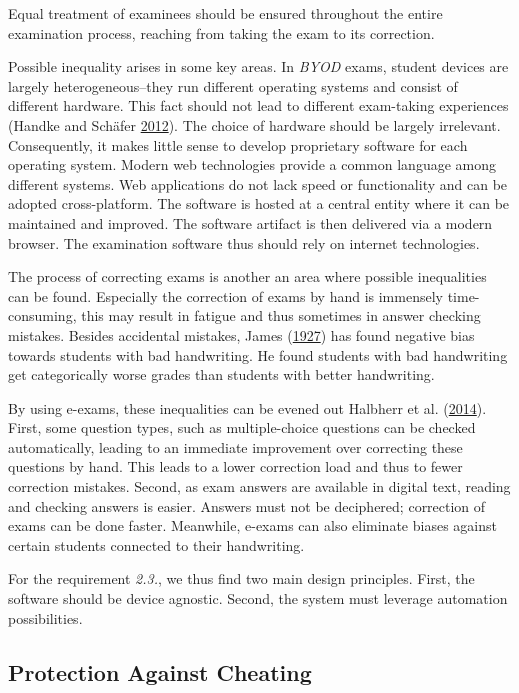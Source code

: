 Equal treatment of examinees should be ensured throughout the entire
examination process, reaching from taking the exam to its correction.

Possible inequality arises in some key areas. In \emph{BYOD} exams,
student devices are largely heterogeneous--they run different operating
systems and consist of different hardware. This fact should not lead to
different exam-taking experiences (Handke and Schäfer
\protect\hyperlink{ref-Handke2012}{2012}). The choice of hardware should
be largely irrelevant. Consequently, it makes little sense to develop
proprietary software for each operating system. Modern web technologies
provide a common language among different systems. Web applications do
not lack speed or functionality and can be adopted cross-platform. The
software is hosted at a central entity where it can be maintained and
improved. The software artifact is then delivered via a modern browser.
The examination software thus should rely on internet technologies.

The process of correcting exams is another an area where possible
inequalities can be found. Especially the correction of exams by hand is
immensely time-consuming, this may result in fatigue and thus sometimes
in answer checking mistakes. Besides accidental mistakes, James
(\protect\hyperlink{ref-James1927}{1927}) has found negative bias
towards students with bad handwriting. He found students with bad
handwriting get categorically worse grades than students with better
handwriting.

By using e-exams, these inequalities can be evened out Halbherr et al.
(\protect\hyperlink{ref-Halbherr2014}{2014}). First, some question
types, such as multiple-choice questions can be checked automatically,
leading to an immediate improvement over correcting these questions by
hand. This leads to a lower correction load and thus to fewer correction
mistakes. Second, as exam answers are available in digital text, reading
and checking answers is easier. Answers must not be deciphered;
correction of exams can be done faster. Meanwhile, e-exams can also
eliminate biases against certain students connected to their
handwriting.

For the requirement \emph{2.3.}, we thus find two main design
principles. First, the software should be device agnostic. Second, the
system must leverage automation possibilities.

\hypertarget{protection-against-cheating}{%
\subsection{Protection Against
Cheating}\label{protection-against-cheating}}

